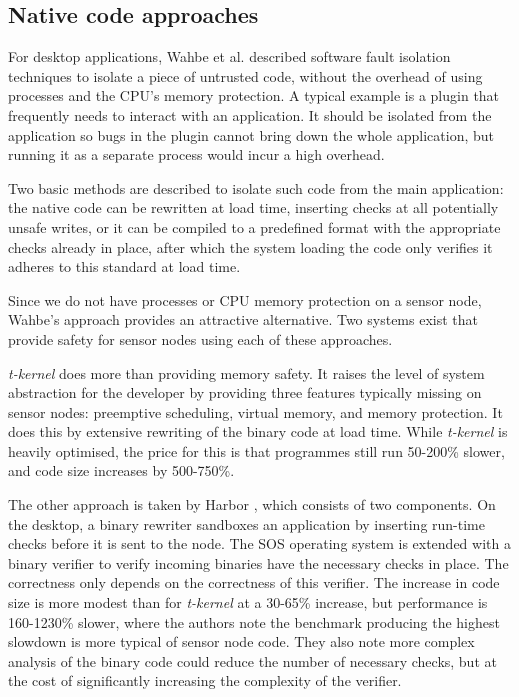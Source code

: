 \subsection{Native code approaches}
For desktop applications, Wahbe et al. described software fault isolation \cite{Wahbe:1994cj} techniques to isolate a piece of untrusted code, without the overhead of using processes and the CPU's memory protection. A typical example is a plugin that frequently needs to interact with an application. It should be isolated from the application so bugs in the plugin cannot bring down the whole application, but running it as a separate process would incur a high overhead.

Two basic methods are described to isolate such code from the main application: the native code can be rewritten at load time, inserting checks at all potentially unsafe writes, or it can be compiled to a predefined format with the appropriate checks already in place, after which the system loading the code only verifies it adheres to this standard at load time.

Since we do not have processes or CPU memory protection on a sensor node, Wahbe's approach provides an attractive alternative. Two systems exist that provide safety for sensor nodes using each of these approaches.

\emph{t-kernel} \cite{Gu:2006ww} does more than providing memory safety. It raises the level of system abstraction for the developer by providing three features typically missing on sensor nodes: preemptive scheduling, virtual memory, and memory protection. It does this by extensive rewriting of the binary code at load time. While \emph{t-kernel} is heavily optimised, the price for this is that programmes still run 50-200\% slower, and code size increases by 500-750\%.

The other approach is taken by Harbor \cite{Kumar:2007ge}, which consists of two components. On the desktop, a binary rewriter sandboxes an application by inserting run-time checks before it is sent to the node. The SOS operating system \cite{Han:2005th} is extended with a binary verifier to verify incoming binaries have the necessary checks in place. The correctness only depends on the correctness of this verifier. The increase in code size is more modest than for \emph{t-kernel} at a 30-65\% increase, but performance is 160-1230\% slower, where the authors note the benchmark producing the highest slowdown is more typical of sensor node code. They also note more complex analysis of the binary code could reduce the number of necessary checks, but at the cost of significantly increasing the complexity of the verifier.

